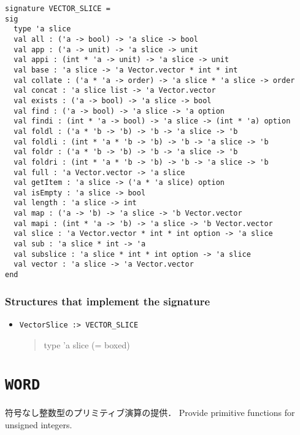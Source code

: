 \documentclass{jbook}
\newcommand{\txt}[2]{#2}
\newcommand{\code}[1]{\mbox{\large\tt #1}}
\newenvironment{program}{\begin{quote}\begin{tt}}%
                        {\end{tt}\end{quote}}
\newcommand{\signature}[2]{
\section{{\tt #1}}\label{section:reference:#2}
}
\newcommand{\Structure}{\subsubsection*{\txt{シグネチャを実装するストラクチャ}{Structures that implement the signature}}}
\begin{document}
\begin{verbatim}
signature VECTOR_SLICE =
sig
  type 'a slice
  val all : ('a -> bool) -> 'a slice -> bool
  val app : ('a -> unit) -> 'a slice -> unit
  val appi : (int * 'a -> unit) -> 'a slice -> unit
  val base : 'a slice -> 'a Vector.vector * int * int
  val collate : ('a * 'a -> order) -> 'a slice * 'a slice -> order
  val concat : 'a slice list -> 'a Vector.vector
  val exists : ('a -> bool) -> 'a slice -> bool
  val find : ('a -> bool) -> 'a slice -> 'a option
  val findi : (int * 'a -> bool) -> 'a slice -> (int * 'a) option
  val foldl : ('a * 'b -> 'b) -> 'b -> 'a slice -> 'b
  val foldli : (int * 'a * 'b -> 'b) -> 'b -> 'a slice -> 'b
  val foldr : ('a * 'b -> 'b) -> 'b -> 'a slice -> 'b
  val foldri : (int * 'a * 'b -> 'b) -> 'b -> 'a slice -> 'b
  val full : 'a Vector.vector -> 'a slice
  val getItem : 'a slice -> ('a * 'a slice) option
  val isEmpty : 'a slice -> bool
  val length : 'a slice -> int
  val map : ('a -> 'b) -> 'a slice -> 'b Vector.vector
  val mapi : (int * 'a -> 'b) -> 'a slice -> 'b Vector.vector
  val slice : 'a Vector.vector * int * int option -> 'a slice
  val sub : 'a slice * int -> 'a
  val subslice : 'a slice * int * int option -> 'a slice
  val vector : 'a slice -> 'a Vector.vector
end
\end{verbatim}

\Structure
\begin{itemize}
\item \code{VectorSlice :> VECTOR\_SLICE}
\begin{program}
  type 'a slice (= boxed)
\end{program}
\end{itemize}


\signature{WORD}{WORD}
\ifjp%
	符号なし整数型のプリミティブ演算の提供．
\else%
	Provide primitive functions for unsigned integers.
\fi%
\end{document}
